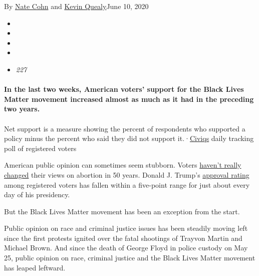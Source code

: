 By \href{https://www.nytimes3xbfgragh.onion/by/nate-cohn}{Nate Cohn} and
\href{https://www.nytimes3xbfgragh.onion/by/kevin-quealy}{Kevin
Quealy}June 10, 2020

\begin{itemize}
\item
\item
\item
\item
\item
  \emph{227}
\end{itemize}

\hypertarget{in-the-last-two-weeks-american-voters-support-for-the-black-lives-matter-movement-increased-almost-as-much-as-it-had-in-the-preceding-two-years}{%
\paragraph{In the last two weeks, American voters' support for the Black
Lives Matter movement increased almost as much as it had in the
preceding two
years.}\label{in-the-last-two-weeks-american-voters-support-for-the-black-lives-matter-movement-increased-almost-as-much-as-it-had-in-the-preceding-two-years}}

\paragraph{}

Net support is a measure showing the percent of respondents who
supported a policy minus the percent who said they did not support
it.·\href{https://civiqs.com/results/black_lives_matter?uncertainty=true\&annotations=true\&zoomIn=true}{Civiqs}
daily tracking poll of registered voters

American public opinion can sometimes seem stubborn. Voters
\href{https://www.nytimes3xbfgragh.onion/2015/06/30/upshot/why-gun-control-and-abortion-are-different-from-gay-marriage.html}{haven't
really changed} their views on abortion in 50 years. Donald J. Trump's
\href{https://projects.fivethirtyeight.com/trump-approval-ratings/}{approval
rating} among registered voters has fallen within a five-point range for
just about every day of his presidency.

But the Black Lives Matter movement has been an exception from the
start.

Public opinion on race and criminal justice issues has been steadily
moving left since the first protests ignited over the fatal shootings of
Trayvon Martin and Michael Brown. And since the death of George Floyd in
police custody on May 25, public opinion on race, criminal justice and
the Black Lives Matter movement has leaped leftward.

